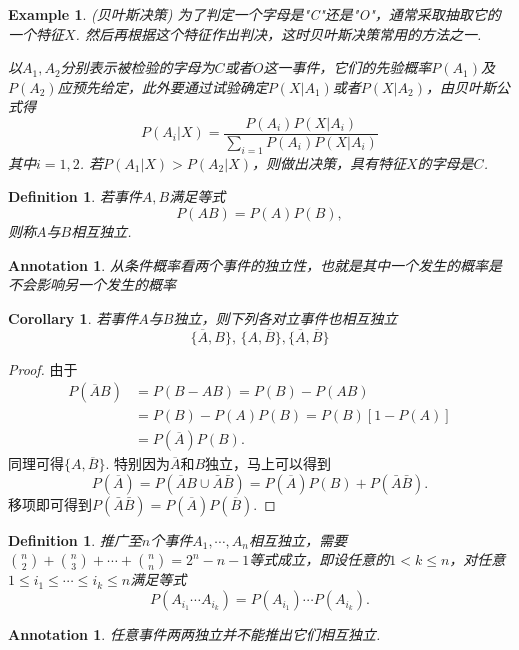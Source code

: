\documentclass{article}
\newtheorem{corollary}[theorem]{Corollary}
\newtheorem{example}[theorem]{Example}
\newtheorem{definition}[theorem]{Definition}
\newtheorem{annotation}[theorem]{Annotation}
\begin{document}
\begin{example}
\rm {\color{red}(贝叶斯决策)} 为了判定一个字母是"C"还是"O"，通常采取抽取它的一个特征$X$. 然后再根据这个特征作出判决，这时贝叶斯决策常用的方法之一. 

以$A_1,A_2$分别表示被检验的字母为$C$或者$O$这一事件，它们的先验概率$P(A_1)$及$P(A_2)$应预先给定，此外要通过试验确定$P(X|A_1)$或者$P(X|A_2)$，由贝叶斯公式得
$$
P(A_i|X) = \frac{P(A_i)P(X|A_i)}{\sum\limits_{i=1}P(A_i)P(X|A_i)} 
$$
其中$i=1,2$. 若$P(A_1 | X) > P(A_2 | X)$，则做出决策，具有特征$X$的字母是$C$.
\end{example}

\begin{definition}
\rm 若事件$A,B$满足等式
$$
P(AB) = P(A)P(B),
$$
则称$A$与$B${\color{red}相互独立}. 
\end{definition}

\begin{annotation}
\rm {\color{blue} 从条件概率看两个事件的独立性，也就是其中一个发生的概率是不会影响另一个发生的概率}
\end{annotation}

\begin{corollary}
\rm 若事件$A$与$B$独立，则下列各对立事件也相互独立
$$
\{\overline{A}, B\},\, \{A,\overline{B}\}, \{\overline{A},\overline{B}\}
$$
\end{corollary}

\begin{proof}
由于
$$
\begin{array}{ll}
P(\overline{A}B) &= P(B-AB)=P(B)-P(AB)\\
&= P(B)-P(A)P(B) = P(B)[1-P(A)]\\
&= P(\overline{A})P(B).  
\end{array}
$$
同理可得$\{A,\overline{B}\}$. 特别因为$\overline{A}$和$B$独立，马上可以得到
$$
P(\overline{A}) = P(\overline{A}B \cup \bar{A}\bar{B}) = P(\overline{A})P(B) + P(\bar{A}\bar{B}). 
$$
移项即可得到$P(\bar{A}\bar{B}) = P(\overline{A})P(\overline{B})$. 
\end{proof}

\begin{definition}
\rm 推广至$n$个事件$A_1,\cdots,A_n$相互独立，需要$\binom n2 + \binom n3 + \cdots + \binom nn = 2^n - n -1$等式成立，即设任意的$1<k \leq n$，对任意$1 \leq i_1 \leq \cdots \leq i_k \leq n$满足等式
$$
P(A_{i_1}\cdots A_{i_k})=P(A_{i_1})\cdots P(A_{i_k}).
$$
\end{definition}

\begin{annotation}
\rm {\color{blue}任意事件两两独立并不能推出它们相互独立}.
\end{annotation}
\end{document}
